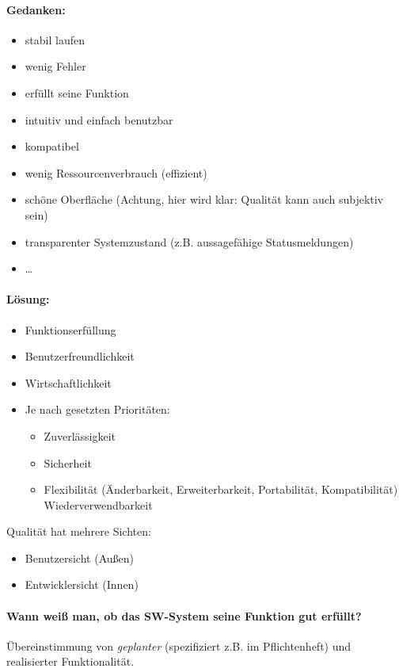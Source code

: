 \paragraph{Gedanken:}
\begin{itemize}
\item stabil laufen
\item wenig Fehler
\item erfüllt seine Funktion
\item intuitiv und einfach benutzbar
\item kompatibel
\item wenig Ressourcenverbrauch (effizient)
\item schöne Oberfläche (Achtung, hier wird klar: Qualität kann auch subjektiv sein)
\item transparenter Systemzustand (z.B. aussagefähige Statusmeldungen)
\item …
\end{itemize}
\paragraph{Lösung:}
\begin{itemize}
\item Funktionserfüllung
\item Benutzerfreundlichkeit
\item Wirtschaftlichkeit
\item Je nach gesetzten Prioritäten:
\begin{itemize}
\item Zuverlässigkeit
\item Sicherheit
\item Flexibilität (Änderbarkeit, Erweiterbarkeit, Portabilität, Kompatibilität)
Wiederverwendbarkeit
\end{itemize}
\end{itemize}

Qualität hat mehrere Sichten:
\begin{itemize}
\item Benutzersicht (Außen)
\item Entwicklersicht (Innen)
\end{itemize}
\paragraph{Wann weiß man, ob das SW-System seine Funktion gut erfüllt?}
Übereinstimmung von \emph{geplanter} (spezifiziert z.B. im Pflichtenheft) und realisierter Funktionalität.

